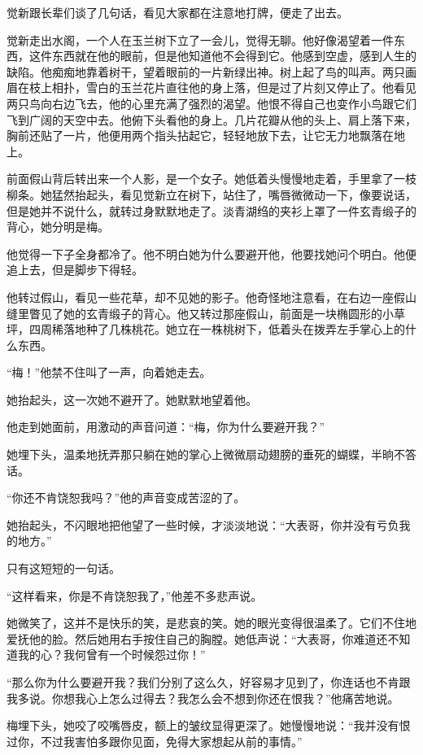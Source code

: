 \par 觉新跟长辈们谈了几句话，看见大家都在注意地打牌，便走了出去。
\par 觉新走出水阁，一个人在玉兰树下立了一会儿，觉得无聊。他好像渴望着一件东西，这件东西就在他的眼前，但是他知道他不会得到它。他感到空虚，感到人生的缺陷。他痴痴地靠着树干，望着眼前的一片新绿出神。树上起了鸟的叫声。两只画眉在枝上相扑，雪白的玉兰花片直往他的身上落，但是过了片刻又停止了。他看见两只鸟向右边飞去，他的心里充满了强烈的渴望。他恨不得自己也变作小鸟跟它们飞到广阔的天空中去。他俯下头看他的身上。几片花瓣从他的头上、肩上落下来，胸前还贴了一片，他便用两个指头拈起它，轻轻地放下去，让它无力地飘落在地上。
\par 前面假山背后转出来一个人影，是一个女子。她低着头慢慢地走着，手里拿了一枝柳条。她猛然抬起头，看见觉新立在树下，站住了，嘴唇微微动一下，像要说话，但是她并不说什么，就转过身默默地走了。淡青湖绉的夹衫上罩了一件玄青缎子的背心，她分明是梅。
\par 他觉得一下子全身都冷了。他不明白她为什么要避开他，他要找她问个明白。他便追上去，但是脚步下得轻。
\par 他转过假山，看见一些花草，却不见她的影子。他奇怪地注意看，在右边一座假山缝里瞥见了她的玄青缎子的背心。他又转过那座假山，前面是一块椭圆形的小草坪，四周稀落地种了几株桃花。她立在一株桃树下，低着头在拨弄左手掌心上的什么东西。
\par “梅！”他禁不住叫了一声，向着她走去。
\par 她抬起头，这一次她不避开了。她默默地望着他。
\par 他走到她面前，用激动的声音问道：“梅，你为什么要避开我？”
\par 她埋下头，温柔地抚弄那只躺在她的掌心上微微扇动翅膀的垂死的蝴蝶，半晌不答话。
\par “你还不肯饶恕我吗？”他的声音变成苦涩的了。
\par 她抬起头，不闪眼地把他望了一些时候，才淡淡地说：“大表哥，你并没有亏负我的地方。”
\par 只有这短短的一句话。
\par “这样看来，你是不肯饶恕我了，”他差不多悲声说。
\par 她微笑了，这并不是快乐的笑，是悲哀的笑。她的眼光变得很温柔了。它们不住地爱抚他的脸。然后她用右手按住自己的胸膛。她低声说：“大表哥，你难道还不知道我的心？我何曾有一个时候怨过你！”
\par “那么你为什么要避开我？我们分别了这么久，好容易才见到了，你连话也不肯跟我多说。你想我心上怎么过得去？我怎么会不想到你还在恨我？”他痛苦地说。
\par 梅埋下头，她咬了咬嘴唇皮，额上的皱纹显得更深了。她慢慢地说：“我并没有恨过你，不过我害怕多跟你见面，免得大家想起从前的事情。”
